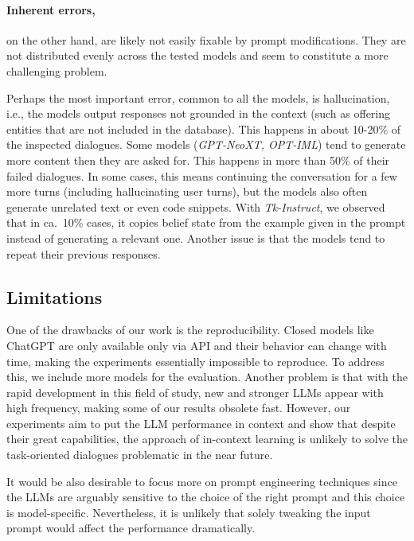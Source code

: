 \paragraph{Inherent errors,} on the other hand, are likely not easily fixable by prompt modifications.
They are not distributed evenly across the tested models and seem to constitute a more challenging problem.

Perhaps the most important error, common to all the models, is hallucination, i.e., the models output responses not grounded in the context (such as offering entities that are not included in the database). This happens in about 10-20\% of the inspected dialogues.
Some models (\emph{GPT-NeoXT, OPT-IML}) tend to generate more content then they are asked for.
This happens in more than 50\% of their failed dialogues.
In some cases, this means continuing the conversation for a few more turns (including hallucinating user turns), but the models also often generate unrelated text or even code snippets.
With \emph{Tk-Instruct}, we observed that in ca.~10\% cases, it copies belief state from the example given in the prompt instead of generating a relevant one.
Another issue is that the models tend to repeat their previous responses.

\subsection{Limitations}
One of the drawbacks of our work is the reproducibility.
Closed models like ChatGPT are only available only via API and their behavior can change with time, making the experiments essentially impossible to reproduce.
To address this, we include more models for the evaluation.
Another problem is that with the rapid development in this field of study, new and stronger LLMs appear with high frequency, making some of our results obsolete fast.
However, our experiments aim to put the LLM performance in context and show that despite their great capabilities, the approach of in-context learning is unlikely to solve the task-oriented dialogues problematic in the near future.

It would be also desirable to focus more on prompt engineering techniques since the LLMs are arguably sensitive to the choice of the right prompt and this choice is model-specific.
Nevertheless, it is unlikely that solely tweaking the input prompt would affect the performance dramatically.

